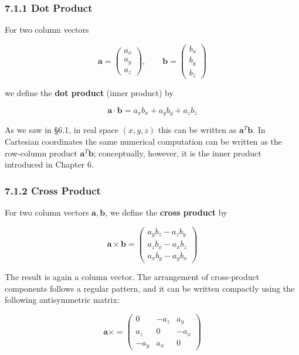 \hypertarget{dot-product}{%
\subsubsection{7.1.1 Dot Product}\label{dot-product}}

For two column vectors

\[
\mathbf{a}
=
\begin{pmatrix}
a_x\\
a_y\\
a_z
\end{pmatrix},
\qquad
\mathbf{b}
=
\begin{pmatrix}
b_x\\
b_y\\
b_z
\end{pmatrix}
\]

we define the \textbf{dot product} (inner product) by

\[\mathbf{a} \cdot \mathbf{b} = a_x b_x + a_y b_y + a_z b_z\]

As we saw in §6.1, in real space \((x,y,z)\) this can be written as
\(\mathbf{a}^T \mathbf{b}\). In Cartesian coordinates the same numerical
computation can be written as the row-column product
\(\mathbf a^T\mathbf b\); conceptually, however, it is the inner product
introduced in Chapter 6.

\hypertarget{cross-product}{%
\subsubsection{7.1.2 Cross Product}\label{cross-product}}

For two column vectors \(\mathbf{a}, \mathbf{b}\), we define the
\textbf{cross product} by

\[\mathbf{a} \times \mathbf{b} = \begin{pmatrix}
a_y b_z - a_z b_y \\
a_z b_x - a_x b_z \\
a_x b_y - a_y b_x
\end{pmatrix}\]

The result is again a column vector. The arrangement of cross-product
components follows a regular pattern, and it can be written compactly
using the following antisymmetric matrix:

\[\mathbf{a} \times = \begin{pmatrix}
0 & -a_z & a_y \\
a_z & 0 & -a_x \\
-a_y & a_x & 0
\end{pmatrix}\]

